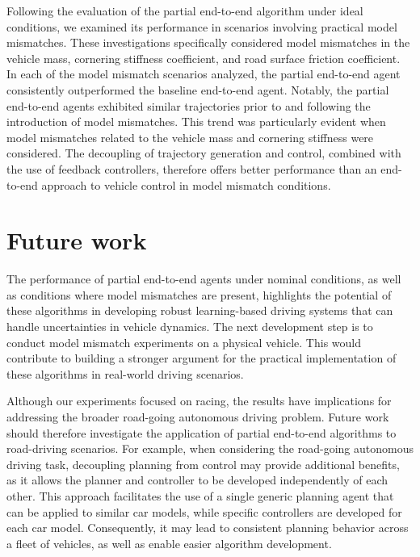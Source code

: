 Following the evaluation of the partial end-to-end algorithm under ideal conditions, we examined its performance in scenarios involving practical model mismatches. 
These investigations specifically considered model mismatches in the vehicle mass, cornering stiffness coefficient, and road surface friction coefficient.
In each of the model mismatch scenarios analyzed, the partial end-to-end agent consistently outperformed the baseline end-to-end agent. 
Notably, the partial end-to-end agents exhibited similar trajectories prior to and following the introduction of model mismatches. 
This trend was particularly evident when model mismatches related to the vehicle mass and cornering stiffness were considered.
The decoupling of trajectory generation and control, combined with the use of feedback controllers, therefore offers better performance than an end-to-end approach to vehicle control in model mismatch conditions.



\section{Future work}

The performance of partial end-to-end agents under nominal conditions, as well as conditions where model mismatches are present, highlights the potential of these algorithms in developing robust learning-based driving systems that can handle uncertainties in vehicle dynamics.
The next development step is to conduct model mismatch experiments on a physical vehicle.
This would contribute to building a stronger argument for the practical implementation of these algorithms in real-world driving scenarios.


Although our experiments focused on racing, the results have implications for addressing the broader road-going autonomous driving problem.
Future work should therefore investigate the application of partial end-to-end algorithms to road-driving scenarios.
For example, when considering the road-going autonomous driving task, decoupling planning from control may provide additional benefits, as it allows the planner and controller to be developed independently of each other.
This approach facilitates the use of a single generic planning agent that can be applied to similar car models, while specific controllers are developed for each car model.
Consequently, it may lead to consistent planning behavior across a fleet of vehicles, as well as enable easier algorithm development.


